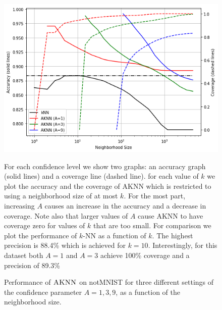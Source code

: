 \documentclass{article}
\newcommand{\algname}{\textsc{AKNN}}
\begin{document}
\begin{figure}[th]
    \begin{minipage}{0.57\textwidth}
    \centering
        \includegraphics[width=\linewidth]{figs/notMNIST/notMNIST_combinedGraphs.png}
        \caption{\small Performance of $\algname$ on notMNIST for three different
          settings of the confidence parameter $A=1,3,9$, as a
          function of the neighborhood size.}
      \end{minipage}
      \hspace{0.2cm}
      \begin{minipage}{0.4\textwidth}
        \begin{small}
          For each confidence level we show two graphs: an accuracy
          graph (solid lines) and a coverage line (dashed line). for
          each value of $k$ we plot the accuracy and the coverage of
          AKNN which is restricted to using a neighborhood size of at
          most $k$. For the most part, increasing $A$ causes an
          increase in the accuracy and a decrease in coverage. Note
          also that larger values of $A$ cause AKNN to have coverage
          zero for values of $k$ that are too small. For comparison we
          plot the performance of $k$-NN as a function of $k$. The
          highest precision is 88.4\% which is achieved for
          $k=10$. Interestingly, for this dataset both $A=1$ and $A=3$
          achieve 100\% coverage and a precision of 89.3\%          
          \end{small}
      \end{minipage}  
  \label{fig:aknnvsknn}
\end{figure}
\end{document}
